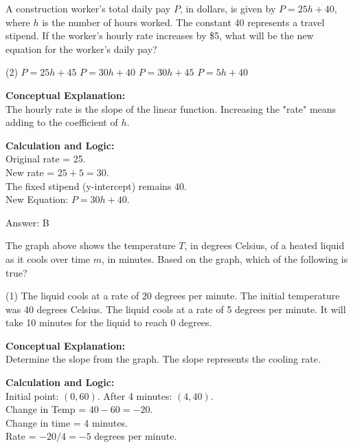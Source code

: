 \documentclass[11pt,paper=a4,answers]{exam}
\begin{document}
\begin{questions}
\question
A construction worker’s total daily pay $P$, in dollars, is given by $P = 25h + 40$, where $h$ is the number of hours worked. The constant 40 represents a travel stipend. If the worker’s hourly rate increases by \$5, what will be the new equation for the worker’s daily pay?
\begin{tasks}(2)
    \task $P = 25h + 45$
    \task $P = 30h + 40$
    \task $P = 30h + 45$
    \task $P = 5h + 40$
\end{tasks}

\begin{solution}
\textbf{Conceptual Explanation:} \\
The hourly rate is the slope of the linear function. Increasing the "rate" means adding to the coefficient of $h$.

\vspace{10pt}
\textbf{Calculation and Logic:} \\
Original rate = 25. \\
New rate = $25 + 5 = 30$. \\
The fixed stipend (y-intercept) remains 40. \\
New Equation: $P = 30h + 40$.

\vspace{15pt}
Answer: \colorbox{yellow!100}{B}
\end{solution}

\vspace{20pt}

\question

The graph above shows the temperature $T$, in degrees Celsius, of a heated liquid as it cools over time $m$, in minutes. Based on the graph, which of the following is true?
\begin{tasks}(1)
    \task The liquid cools at a rate of 20 degrees per minute.
    \task The initial temperature was 40 degrees Celsius.
    \task The liquid cools at a rate of 5 degrees per minute.
    \task It will take 10 minutes for the liquid to reach 0 degrees.
\end{tasks}

\begin{solution}
\textbf{Conceptual Explanation:} \\
Determine the slope from the graph. The slope represents the cooling rate.

\vspace{10pt}
\textbf{Calculation and Logic:} \\
Initial point: $(0, 60)$. After 4 minutes: $(4, 40)$. \\
Change in Temp = $40 - 60 = -20$. \\
Change in time = 4 minutes. \\
Rate = $-20 / 4 = -5$ degrees per minute.


\end{solution}
\end{questions}
\end{document}
